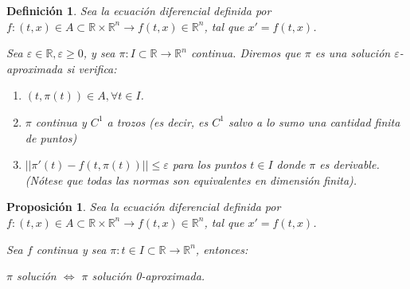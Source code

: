 \documentclass{article}
\theoremstyle{theorem-style}  %
\newtheorem{proposition}[theorem]{Proposición}
\theoremstyle{definition-style}
\newtheorem{definition}{Definición}[section]
\theoremstyle{example-style}
\begin{document}
\begin{definition}
	Sea la ecuación diferencial definida por $ f:(t,x) \in A \subset \mathbb{R}\times \mathbb{R}^n\longrightarrow f(t,x)\in \mathbb{R}^n$, tal que $ x'=f(t,x) $.
	
	Sea $ \varepsilon\in \mathbb{R}, \varepsilon\geq 0 $, y sea $ \pi : I\subset \mathbb{R} \longrightarrow \mathbb{R}^n $ continua. Diremos que $ \pi $ es una \emph{solución $ \varepsilon $-aproximada} si verifica:
	
	\begin{enumerate}
		\item $ (t,\pi (t))\in A, \forall t \in I $.
		\item $ \pi $ continua y $C^1$ a trozos (es decir, es $C^1$ salvo a lo sumo una cantidad finita de puntos)
		\item $ || \pi'(t)-f(t, \pi(t))|| \leq \varepsilon$ para los puntos $ t\in I $ donde $ \pi $ es derivable. (Nótese que todas las normas son equivalentes en dimensión finita).
	\end{enumerate} 
\end{definition}
\begin{proposition}
	Sea la ecuación diferencial definida por $ f:(t,x) \in A \subset \mathbb{R}\times \mathbb{R}^n\longrightarrow f(t,x)\in \mathbb{R}^n$, tal que $ x'=f(t,x) $.
	
	Sea $ f $ continua y sea $ \pi : t \in I \subset \mathbb{R} \longrightarrow\mathbb{R}^n $, entonces:
	\begin{center}
		$ \pi  $ solución $ \Leftrightarrow $ $ \pi $ solución 0-aproximada.
	\end{center}
\end{proposition}
\end{document}
